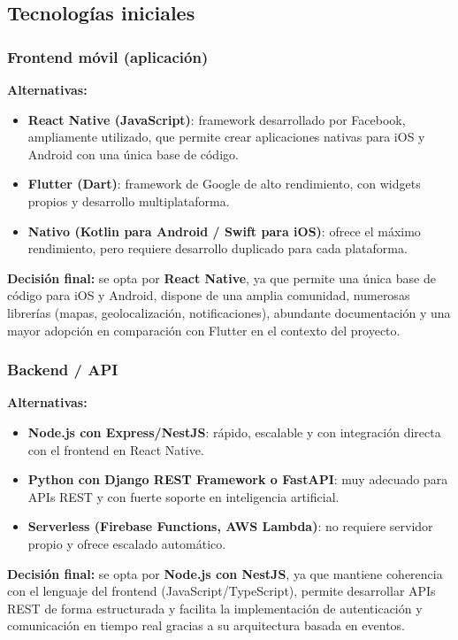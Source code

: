 \documentclass[12pt]{article}
\begin{document}
\subsection{Tecnologías iniciales}

\subsubsection{Frontend móvil (aplicación)}
\textbf{Alternativas:}
\begin{itemize}
    \item \textbf{React Native (JavaScript)}: framework desarrollado por Facebook, ampliamente utilizado, que permite crear aplicaciones nativas para iOS y Android con una única base de código.
    \item \textbf{Flutter (Dart)}: framework de Google de alto rendimiento, con widgets propios y desarrollo multiplataforma.
    \item \textbf{Nativo (Kotlin para Android / Swift para iOS)}: ofrece el máximo rendimiento, pero requiere desarrollo duplicado para cada plataforma.
\end{itemize}

\textbf{Decisión final:} se opta por \textbf{React Native}, ya que permite una única base de código para iOS y Android, dispone de una amplia comunidad, numerosas librerías (mapas, geolocalización, notificaciones), abundante documentación y una mayor adopción en comparación con Flutter en el contexto del proyecto.

\subsubsection{Backend / API}
\textbf{Alternativas:}
\begin{itemize}
    \item \textbf{Node.js con Express/NestJS}: rápido, escalable y con integración directa con el frontend en React Native.
    \item \textbf{Python con Django REST Framework o FastAPI}: muy adecuado para APIs REST y con fuerte soporte en inteligencia artificial.
    \item \textbf{Serverless (Firebase Functions, AWS Lambda)}: no requiere servidor propio y ofrece escalado automático.
\end{itemize}

\textbf{Decisión final:} se opta por \textbf{Node.js con NestJS}, ya que mantiene coherencia con el lenguaje del frontend (JavaScript/TypeScript), permite desarrollar APIs REST de forma estructurada y facilita la implementación de autenticación y comunicación en tiempo real gracias a su arquitectura basada en eventos.
\end{document}
